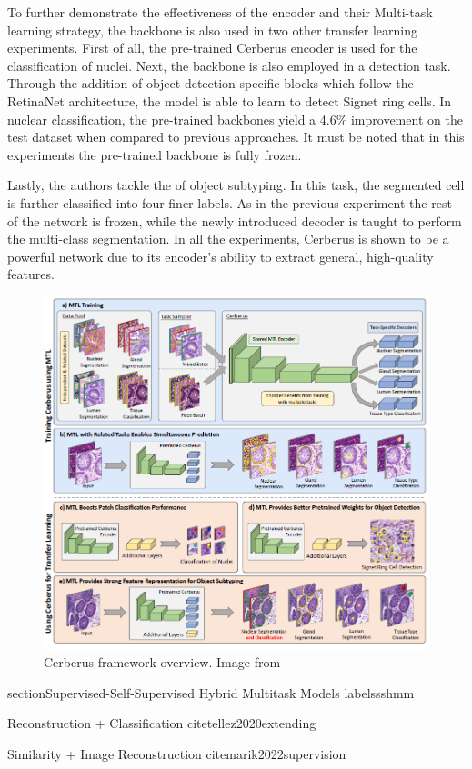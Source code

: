 To further demonstrate the effectiveness of the encoder and their Multi-task learning strategy, the backbone is also used in two other transfer learning experiments. First of all, the pre-trained Cerberus encoder is used for the classification of nuclei. Next, the backbone is also employed in a detection task. Through the addition of object detection specific blocks which follow the RetinaNet \cite{lin2017focal} architecture, the model is able to learn to detect Signet ring cells. In nuclear classification, the pre-trained backbones yield a 4.6\% improvement on the test dataset when compared to previous approaches. It must be noted that in this experiments the pre-trained backbone is fully frozen.

Lastly, the authors tackle the of object subtyping. In this task, the segmented cell is further classified into four finer labels. As in the previous experiment the rest of the network is frozen, while the newly introduced decoder is taught to perform the multi-class segmentation. In all the experiments, Cerberus is shown to be a powerful network due to its encoder's ability to extract general, high-quality features.

\begin{figure}[htb]
    \centering
	\centerline{\includegraphics[scale=0.9]{figures/12.png}}
	\caption{Cerberus framework overview. Image from \cite{dabass2022mtu}}
	\label{cerberus}
\end{figure}

section{Supervised-Self-Supervised Hybrid Multitask Models}
label{ssshmm}

Reconstruction + Classification
cite{tellez2020extending}

Similarity + Image Reconstruction
cite{marik2022supervision}




